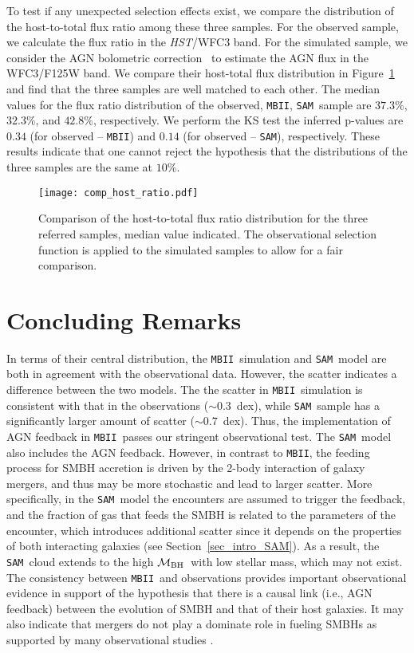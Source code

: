 \documentclass[twocolumn,trackchanges]{aastex63}
\newcommand{\hst}{{\it HST}}
\newcommand{\mbh}{$\mathcal M_{\rm BH}$}
\newcommand{\sam}{\texttt{SAM}}
\newcommand{\mbii}{\texttt{MBII}}
\newcommand{\pink}[1]{{{#1}}}
\begin{document}
To test if any unexpected selection effects exist, we compare the distribution of the host-to-total flux ratio among these three samples. For the observed sample, we calculate the flux ratio in the \hst/WFC3 band. For the simulated sample, we consider the AGN bolometric correction~\citep{Elvis1994} to estimate the AGN flux in the WFC3/F125W band. We compare their host-total flux distribution in Figure~\ref{fig:comp_hist} and find that the three samples are well matched to each other. The median values for the flux ratio distribution of the observed, \mbii, \sam\ sample are $37.3\%$, $32.3\%$, and $42.8\%$, respectively. We perform the KS test the inferred p-values are $0.34$ (for observed -- \mbii) and $0.14$ (for observed -- \sam), respectively. \pink{These results indicate that one cannot reject the hypothesis that the distributions of the three samples are the same at $10\%$.}

\begin{figure}[t]
\texttt{[image: comp\_host\_ratio.pdf]}
\caption{Comparison of the host-to-total flux ratio distribution for the three referred samples, median value indicated. The observational selection function is applied to the simulated samples to allow for a fair comparison.
}
\label{fig:comp_hist}
\end{figure}

\section{Concluding Remarks}
\label{sec:conclusion}
In terms of their central distribution, the \mbii\ simulation and \sam\ model are both in agreement with the observational data. However, the scatter indicates a difference between the two models. The  the scatter in \mbii\ simulation is consistent with that in the observations ($\sim0.3$~dex), while \sam\ sample has a significantly larger amount of scatter ($\sim0.7$~dex). Thus, the implementation of AGN feedback in \mbii\ passes our stringent observational test. The \sam\ model also includes the AGN feedback. However, in contrast to \mbii, the feeding process for SMBH accretion is driven by the 2-body interaction of galaxy mergers, and thus may be more stochastic and lead to larger scatter. More specifically, in the \sam\ model the encounters are assumed to trigger the feedback, and the fraction of gas that feeds the SMBH is related to the parameters of the encounter, which introduces additional scatter since it depends on the properties of both interacting galaxies (see Section~\ref{sec_intro_SAM}). As a result, the \sam\ cloud extends to the high \mbh\ with low stellar mass, which may not exist. The consistency between \mbii\ and observations provides important observational evidence in support of the hypothesis that there is a causal link (i.e., AGN feedback) between the evolution of SMBH and that of their host galaxies. It may also indicate that mergers do not play a dominate role in fueling SMBHs as supported by many observational studies \citep{Ellison2011, Silverman2011,Mechtley2016,Goulding2018}.
\end{document}
